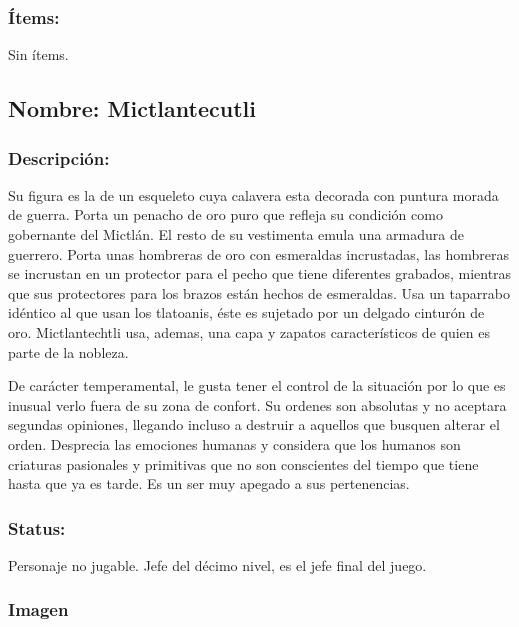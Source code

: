 \documentclass[11pt,letterpaper]{article}
\begin{document}
\subsubsection{Ítems:}
Sin ítems.

\subsection{Nombre: Mictlantecutli}  \label{per.mictlantecutli}
\subsubsection{Descripción:}   
Su figura es la de un esqueleto cuya calavera esta decorada con puntura morada de guerra. Porta un penacho de oro puro que refleja su condición como gobernante del Mictlán. El resto de su vestimenta emula una armadura de guerrero. Porta unas hombreras de oro con esmeraldas incrustadas, las hombreras se incrustan en un protector para el pecho que tiene diferentes grabados, mientras que sus protectores para los brazos están hechos de esmeraldas. Usa un taparrabo idéntico al que usan los tlatoanis, éste es sujetado por un delgado cinturón de oro. Mictlantechtli usa, ademas, una capa y zapatos característicos de quien es parte de la nobleza.
\\
\par
De carácter temperamental, le gusta tener el control de la situación por lo que es inusual verlo fuera de su zona de confort. Su ordenes son absolutas y no aceptara segundas opiniones, llegando incluso a destruir a aquellos que busquen alterar el orden. Desprecia las emociones humanas y considera que los humanos son criaturas pasionales y primitivas que no son conscientes del tiempo que tiene hasta que ya es tarde. Es un ser muy apegado a sus pertenencias. 
\subsubsection{Status:}
Personaje no jugable.
Jefe del décimo nivel, es el jefe final del juego.
\subsubsection{Imagen}
\end{document}
